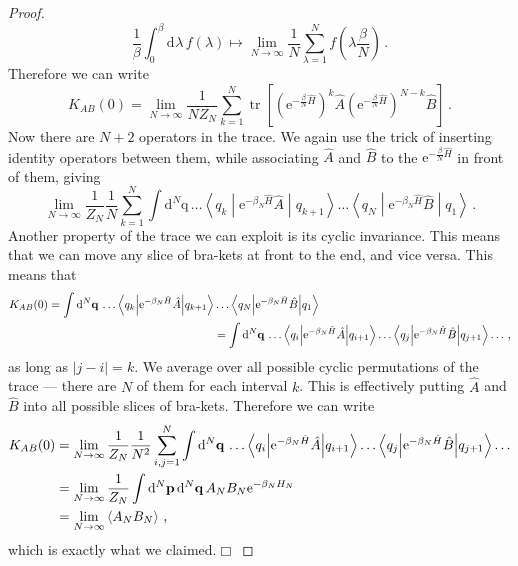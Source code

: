 \documentclass{article}
\theoremstyle{plain}\theoremheaderfont{\normalfont\itshape}\theorembodyfont{\rmfamily}\theoremseparator{.}\newtheorem*{rem}{Remark}\newtheorem*{ex}{Example}\newtheorem*{proof}{Proof}\newtheorem*{altp}{Alternative proof}
\theoremstyle{plain}\theoremheaderfont{\normalfont\bfseries}\theorembodyfont{\rmfamily}\theoremseparator{.}\newtheorem{thm}{Theorem}[section]\newtheorem{lem}[thm]{Lemma}\newtheorem{prop}[thm]{Proposition}\newtheorem*{cor}{Corollary}\newtheorem{defn}[thm]{Definition}\newtheorem{clm}[thm]{Claim}\newtheorem{clminproof}{Claim}
\theoremstyle{break}\theoremheaderfont{\normalfont\itshape}\theorembodyfont{\rmfamily}\theoremseparator{.\medskip}\newtheorem*{proofskip}{Proof}\newtheorem*{exs}{Examples}\newtheorem*{rems}{Remarks}
\theoremstyle{break}\theoremheaderfont{\normalfont\bfseries}\theorembodyfont{\rmfamily}\theoremseparator{.\medskip}\newtheorem{lemskip}[thm]{Lemma}\newtheorem{defnskip}[thm]{Definition}\newtheorem{propskip}[thm]{Proposition}\newtheorem{thmskip}[thm]{Theorem}
\numberwithin{equation}{section}
\newcommand{\qed}{\hfill\ensuremath{\Box}}
\newcommand{\ee}{\mathrm{e}}
\newcommand{\dd}[2][]{\mathrm{d}^{#1} #2\,}
\newcommand{\mel}[3]{\left\langle #1 \middle| #2 \middle| #3 \right\rangle}
\newcommand{\eval}[1]{\left\langle #1 \right\rangle}
\newcommand{\vb}[1]{\bm{\mathrm{#1}}}
\newcommand{\abs}[1]{\left| #1 \right|}
\DeclareMathOperator{\tr}{tr}
\begin{document}
\begin{proof}
        \begin{equation}
            \frac{1}{\beta}\int_{0}^{\beta}\dd{\lambda}f(\lambda)\longmapsto \lim_{N\to\infty}\frac{1}{N}\sum_{\lambda=1}^{N}f\left(\lambda\frac{\beta}{N}\right)\,.
        \end{equation}
        Therefore we can write
        \begin{equation}
            K_{AB}(0)=\lim_{N\to\infty}\frac{1}{N Z_N}\sum_{k=1}^{N}\tr\left[\left(\ee^{-\frac{\beta}{N}\hat{H}}\right)^{k}\hat{A}\left(\ee^{-\frac{\beta}{N}\hat{H}}\right)^{N-k}\hat{B}\right]\,.
        \end{equation}
        Now there are \(N+2\) operators in the trace. We again use the trick of inserting identity operators between them, while associating \(\hat{A}\) and \(\hat{B}\) to the \(\ee^{-\frac{\beta}{N}\hat{H}}\) in front of them, giving
        \begin{equation}
            \lim_{N\to\infty}\frac{1}{Z_N}\frac{1}{N}\sum_{k=1}^{N}\int\dd[N]{\vb{q}}\dots\mel{q_k}{\ee^{-\beta_N \hat{H}}\hat{A}}{q_{k+1}}\dots\mel{q_N}{\ee^{-\beta_N\hat{H}}\hat{B}}{q_1}\,.
        \end{equation}
        Another property of the trace we can exploit is its cyclic invariance. This means that we can move any slice of bra-kets at front to the end, and vice versa. This means that
        \begin{align}
            K_{AB}(0)=\int\dd[N]{\vb{q}}\dots\mel{q_k}{\ee^{-\beta_N \hat{H}}\hat{A}}{q_{k+1}}&\dots\mel{q_N}{\ee^{-\beta_N\hat{H}}\hat{B}}{q_1}\notag\\
            &=\int\dd[N]{\vb{q}}\dots\mel{q_i}{\ee^{-\beta_N \hat{H}}\hat{A}}{q_{i+1}}\dots\mel{q_{j}}{\ee^{-\beta_N\hat{H}}\hat{B}}{q_{j+1}}\dots\,,
        \end{align}
        as long as \(\abs{j-i}=k\). We average over all possible cyclic permutations of the trace --- there are \(N\) of them for each interval \(k\). This is effectively putting \(\hat{A}\) and \(\hat{B}\) into all possible slices of bra-kets. Therefore we can write
        \begin{align}
            K_{AB}(0)&=\lim_{N\to\infty}\frac{1}{Z_N}\frac{1}{N^2}\sum_{i,j=1}^{N}\int\dd[N]{\vb{q}}\dots\mel{q_i}{\ee^{-\beta_N \hat{H}}\hat{A}}{q_{i+1}}\dots\mel{q_j}{\ee^{-\beta_N\hat{H}}\hat{B}}{q_{j+1}}\dots\notag\\
            &=\lim_{N\to\infty}\frac{1}{Z_N}\int\dd[N]{\vb{p}}\dd[N]{\vb{q}}A_N B_N \ee^{-\beta_N H_N}\notag\\
            &=\lim_{N\to\infty}\eval{A_N B_N}\,,
        \end{align}
        which is exactly what we claimed.\qed


    \end{proof}
\end{document}
